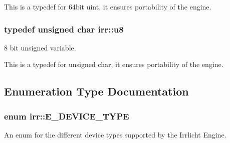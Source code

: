 This is a typedef for 64bit uint, it ensures portability of the engine. 
\subsubsection[{\texorpdfstring{u8}{u8}}]{\setlength{\rightskip}{0pt plus 5cm}typedef unsigned char {\bf irr\+::u8}}\hypertarget{namespaceirr_a646874f69af8ff87fc10201b0254a761}{}\label{namespaceirr_a646874f69af8ff87fc10201b0254a761}


8 bit unsigned variable. 

This is a typedef for unsigned char, it ensures portability of the engine. 

\subsection{Enumeration Type Documentation}
\subsubsection[{\texorpdfstring{E\+\_\+\+D\+E\+V\+I\+C\+E\+\_\+\+T\+Y\+PE}{E\_DEVICE\_TYPE}}]{\setlength{\rightskip}{0pt plus 5cm}enum {\bf irr\+::\+E\+\_\+\+D\+E\+V\+I\+C\+E\+\_\+\+T\+Y\+PE}}\hypertarget{namespaceirr_ac25d94cf2e1037c7ca18ee79b3bd4505}{}\label{namespaceirr_ac25d94cf2e1037c7ca18ee79b3bd4505}


An enum for the different device types supported by the Irrlicht Engine. 

